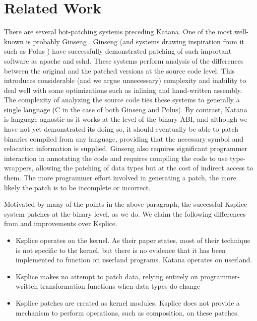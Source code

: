 \section{Related Work}
\label{sec:related}

There are several hot-patching systems preceding Katana. One of the
most well-known is probably Ginseng \cite{ginseng}. Ginseng (and
systems drawing inspiration from it such as Polus \cite{polus}) have
successfully demonstrated patching of such important software as
apache and sshd. These systems perform analysis of the differences
between the original and the patched versions at the source code
level. This introduces considerable (and we argue unnecessary)
complexity and inability to deal well with some optimizations such as
inlining and hand-written assembly. The complexity of analyzing the
source code ties these systems to generally a single language (C in
the case of both Ginseng and Polus). By contrast, Katana is language
agnostic as it works at the level of the binary ABI, and although we
have not yet demonstrated its doing so, it should eventually be able to
patch binaries compiled from any language, providing that the necessary
symbol and relocation information is supplied. Ginseng also requires
significant programmer interaction in annotating the code
\cite{ginseng-manual} and requires compiling the code to use
type-wrappers, allowing the patching of data types but at the cost of
indirect access to them. The more programmer effort involved in
generating a patch, the more likely the patch is to be incomplete or
incorrect.

Motivated by many of the points in the above paragraph, the
successful Ksplice system \cite{ksplice} patches at the binary level, as we do. We
claim the following differences from and improvements over Ksplice.
\begin{itemize}
\item Ksplice operates on the kernel. As their paper states, most of their
  technique is not specific to the kernel, but there is no evidence
  that it has been implemented to function on userland programs.
  Katana operates on userland.
\item Ksplice makes no attempt to patch data, relying entirely on
  programmer-written transformation functions when data types do
  change
\item Ksplice patches are created as kernel modules. Ksplice does not
  provide a mechanism to perform operations, such as composition,
  on these patches.
\end{itemize}


